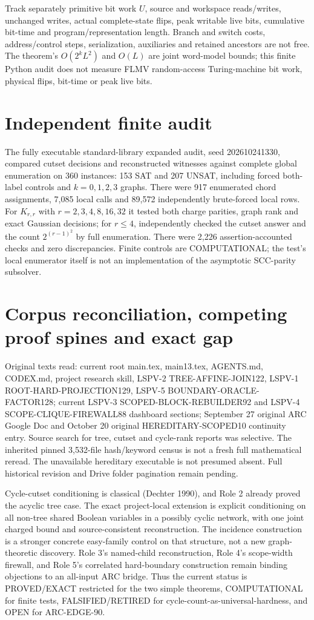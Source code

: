 \documentclass[11pt]{article}
\begin{document}
Track separately primitive bit work $U$, source and workspace reads/writes, unchanged writes, actual complete-state flips, peak writable live bits, cumulative bit-time and program/representation length. Branch and switch costs, address/control steps, serialization, auxiliaries and retained ancestors are not free. The theorem's $O(2^kL^2)$ and $O(L)$ are joint word-model bounds; this finite Python audit does not measure FLMV random-access Turing-machine bit work, physical flips, bit-time or peak live bits.

\section{Independent finite audit}
The fully executable standard-library expanded audit, seed 202610241330, compared cutset decisions and reconstructed witnesses against complete global enumeration on 360 instances: 153 SAT and 207 UNSAT, including forced both-label controls and $k=0,1,2,3$ graphs. There were 917 enumerated chord assignments, 7,085 local calls and 89,572 independently brute-forced local rows. For $K_{r,r}$ with $r=2,3,4,8,16,32$ it tested both charge parities, graph rank and exact Gaussian decisions; for $r\le4$, independently checked the cutset answer and the count $2^{(r-1)^2}$ by full enumeration. There were 2,226 assertion-accounted checks and zero discrepancies. Finite controls are COMPUTATIONAL; the test's local enumerator itself is not an implementation of the asymptotic SCC-parity subsolver.

\section{Corpus reconciliation, competing proof spines and exact gap}
Original texts read: current root main.tex, main13.tex, AGENTS.md, CODEX.md, project research skill, LSPV-2 TREE-AFFINE-JOIN122, LSPV-1 ROOT-HARD-PROJECTION129, LSPV-5 BOUNDARY-ORACLE-FACTOR128; current LSPV-3 SCOPED-BLOCK-REBUILDER92 and LSPV-4 SCOPE-CLIQUE-FIREWALL88 dashboard sections; September 27 original ARC Google Doc and October 20 original HEREDITARY-SCOPED10 continuity entry. Source search for tree, cutset and cycle-rank reports was selective. The inherited pinned 3,532-file hash/keyword census is not a fresh full mathematical reread. The unavailable hereditary executable is not presumed absent. Full historical revision and Drive folder pagination remain pending.

Cycle-cutset conditioning is classical (Dechter 1990), and Role 2 already proved the acyclic tree case. The exact project-local extension is explicit conditioning on all non-tree shared Boolean variables in a possibly cyclic network, with one joint charged bound and source-consistent reconstruction. The incidence construction is a stronger concrete easy-family control on that structure, not a new graph-theoretic discovery. Role 3's named-child reconstruction, Role 4's scope-width firewall, and Role 5's correlated hard-boundary construction remain binding objections to an all-input ARC bridge. Thus the current status is PROVED/EXACT restricted for the two simple theorems, COMPUTATIONAL for finite tests, FALSIFIED/RETIRED for cycle-count-as-universal-hardness, and OPEN for ARC-EDGE-90.
\end{document}
